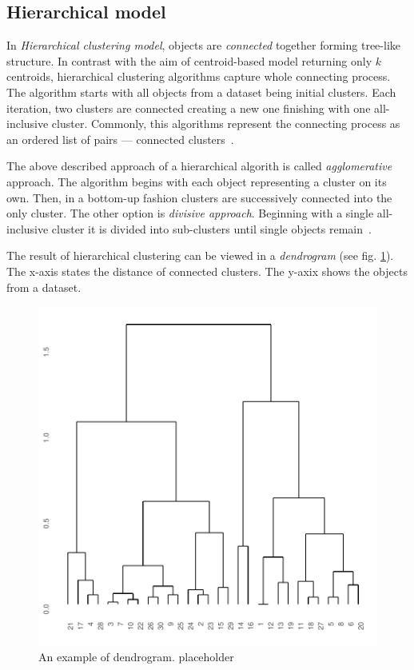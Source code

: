 \subsection{Hierarchical model}

In \emph{Hierarchical clustering model}, objects are \emph{connected} together forming tree-like structure. In contrast with the aim of centroid-based model returning only $k$ centroids, hierarchical clustering algorithms capture whole connecting process. The algorithm starts with all objects from a dataset being initial clusters. Each iteration, two clusters are connected creating a new one finishing with one all-inclusive cluster. Commonly, this algorithms represent the connecting process as an ordered list of pairs --- connected clusters~\cite{karypis1999chameleon}.

The above described approach of a hierarchical algorith is called \emph{agglomerative} approach. The algorithm begins with each object representing a cluster on its own. Then, in a bottom-up fashion clusters are successively connected into the only cluster. The other option is \emph{divisive approach}. Beginning with a single all-inclusive cluster it is divided into sub-clusters until single objects remain~\cite{rokach2005clustering}. 

The result of hierarchical clustering can be viewed in a \emph{dendrogram} (see fig. \ref{fig01:dendro}). The x-axis states the distance of connected clusters. The y-axix shows the objects from a dataset.

\begin{figure}\centering
	\includegraphics[width=\linewidth]{img/dendro}
	\caption{An example of dendrogram. placeholder }
	\label{fig01:dendro}
\end{figure}

